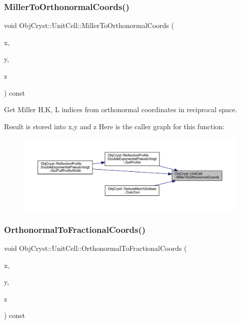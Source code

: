 \subsubsection{\texorpdfstring{MillerToOrthonormalCoords()}{MillerToOrthonormalCoords()}}
{\footnotesize\ttfamily void Obj\+Cryst\+::\+Unit\+Cell\+::\+Miller\+To\+Orthonormal\+Coords (\begin{DoxyParamCaption}\item[{R\+E\+AL \&}]{x,  }\item[{R\+E\+AL \&}]{y,  }\item[{R\+E\+AL \&}]{z }\end{DoxyParamCaption}) const}



Get Miller H,K, L indices from orthonormal coordinates in reciprocal space. 

Result is stored into x,y and z Here is the caller graph for this function\+:
\nopagebreak
\begin{figure}[H]
\begin{center}
\leavevmode
\includegraphics[width=350pt]{class_obj_cryst_1_1_unit_cell_a2c9490f42bf9fa2438eb311ac46fd448_icgraph}
\end{center}
\end{figure}
\mbox{\label{class_obj_cryst_1_1_unit_cell_a69debaf9dc539baf3c5ccc599ae614cd}} 
\subsubsection{\texorpdfstring{OrthonormalToFractionalCoords()}{OrthonormalToFractionalCoords()}}
{\footnotesize\ttfamily void Obj\+Cryst\+::\+Unit\+Cell\+::\+Orthonormal\+To\+Fractional\+Coords (\begin{DoxyParamCaption}\item[{R\+E\+AL \&}]{x,  }\item[{R\+E\+AL \&}]{y,  }\item[{R\+E\+AL \&}]{z }\end{DoxyParamCaption}) const}



